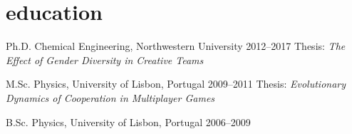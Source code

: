 
\section{education}

\begin{entrylist}


\shortentry
{Ph.D.}
{Chemical Engineering, Northwestern University}
{2012--2017}
{Thesis: \textit{The Effect of Gender Diversity in Creative Teams}}


\shortentry
{M.Sc.}
{Physics, University of Lisbon, Portugal}
{2009--2011}
{Thesis: \textit{Evolutionary Dynamics of Cooperation in Multiplayer Games}}


\shortentry
{B.Sc.}
{Physics, University of Lisbon, Portugal}
{2006--2009}
{}


\end{entrylist}
